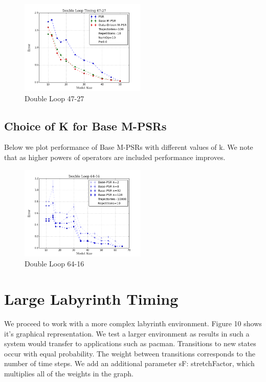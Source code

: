 \begin{figure}[ht!]
\centering
\includegraphics[width=60mm]{uCOREPICS/DL/47-27-10000.png}
\caption{Double Loop 47-27\label{overflow}}
\end{figure}

\subsection{Choice of K for Base M-PSRs}

Below we plot performance of Base M-PSRs with different values of k. We note that as higher powers of operators are included performance improves.

\begin{figure}[ht!]
\centering
\includegraphics[width=60mm]{uCOREPICS/DL/basePows.png}
\caption{Double Loop 64-16\label{overflow}}
\end{figure}

\section{Large Labyrinth Timing}

We proceed to work with a more complex labyrinth environment. Figure 10 shows it's graphical representation. We test a larger environment as results in such a system would transfer to applications such as pacman. Transitions to new states occur with equal probability. The weight between transitions corresponds to the number of time steps. We add an additional parameter sF: stretchFactor, which multiplies all of the weights in the graph. 

